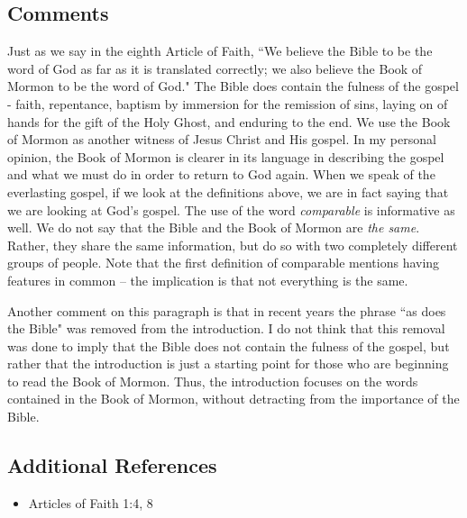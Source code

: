 \documentclass[12pt]{report}
\begin{document}
\subsection{Comments\label{intro:comments1}}
Just as we say in the eighth Article of Faith, ``We believe the Bible to be the word of God as far as it is translated correctly; we also believe the Book of Mormon to be the word of God."  The Bible does contain the fulness of the gospel - faith, repentance, baptism by immersion for the remission of sins, laying on of hands for the gift of the Holy Ghost, and enduring to the end.  We use the Book of Mormon as another witness of Jesus Christ and His gospel.  In my personal opinion, the Book of Mormon is clearer in its language in describing the gospel and what we must do in order to return to God again.  When we speak of the everlasting gospel, if we look at the definitions above, we are in fact saying that we are looking at God's gospel.  The use of the word \emph{comparable} is informative as well.  We do not say that the Bible and the Book of Mormon are \emph{the same}.  Rather, they share the same information, but do so with two completely different groups of people.  Note that the first definition of comparable mentions having features in common -- the implication is that not everything is the same.

Another comment on this paragraph is that in recent years the phrase ``as does the Bible" was removed from the introduction.  I do not think that this removal was done to imply that the Bible does not contain the fulness of the gospel, but rather that the introduction is just a starting point for those who are beginning to read the Book of Mormon.  Thus, the introduction focuses on the words contained in the Book of Mormon, without detracting from the importance of the Bible.

\subsection{Additional References\label{intro:references1}}
\begin{itemize}
\item Articles of Faith 1:4, 8
\end{itemize}

\end{document}
